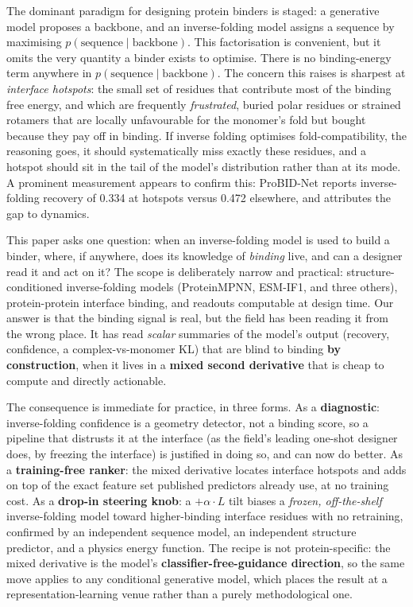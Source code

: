 \documentclass{article} %
\begin{document}
The dominant paradigm for designing protein binders is staged: a generative model proposes a backbone, and an
inverse-folding model assigns a sequence by maximising $p(\text{sequence} \mid \text{backbone})$. This
factorisation is convenient, but it omits the very quantity a binder exists to optimise. There is no
binding-energy term anywhere in $p(\text{sequence} \mid \text{backbone})$. The concern this raises is sharpest at
\emph{interface hotspots}: the small set of residues that contribute most of the binding free energy, and which
are frequently \emph{frustrated}, buried polar residues or strained rotamers that are locally unfavourable for
the monomer's fold but bought because they pay off in binding. If inverse folding optimises fold-compatibility,
the reasoning goes, it should systematically miss exactly these residues, and a hotspot should sit in the tail of
the model's distribution rather than at its mode. A prominent measurement appears to confirm this: ProBID-Net \citep{chen2024probidnet}
reports inverse-folding recovery of 0.334 at hotspots versus 0.472 elsewhere, and attributes the gap to dynamics.

This paper asks one question: when an inverse-folding model is used to build a binder, where, if anywhere, does
its knowledge of \emph{binding} live, and can a designer read it and act on it? The scope is deliberately narrow
and practical: structure-conditioned inverse-folding models (ProteinMPNN, ESM-IF1, and three others),
protein-protein interface binding, and readouts computable at design time. Our answer is that the binding signal
is real, but the field has been reading it from the wrong place. It has read \emph{scalar} summaries of the
model's output (recovery, confidence, a complex-vs-monomer KL) that are blind to binding \textbf{by
construction}, when it lives in a \textbf{mixed second derivative} that is cheap to compute and directly
actionable.

The consequence is immediate for practice, in three forms. As a \textbf{diagnostic}: inverse-folding confidence
is a geometry detector, not a binding score, so a pipeline that distrusts it at the interface (as the field's
leading one-shot designer does, by freezing the interface) is justified in doing so, and can now do better. As a
\textbf{training-free ranker}: the mixed derivative locates interface hotspots and adds on top of the exact
feature set published predictors already use, at no training cost. As a \textbf{drop-in steering knob}: a
$+\alpha \cdot L$ tilt biases a \emph{frozen, off-the-shelf} inverse-folding model toward higher-binding
interface residues with no retraining, confirmed by an independent sequence model, an independent structure
predictor, and a physics energy function. The recipe is not protein-specific: the mixed derivative is the model's
\textbf{classifier-free-guidance direction}, so the same move applies to any conditional generative model, which
places the result at a representation-learning venue rather than a purely methodological one.
\end{document}
